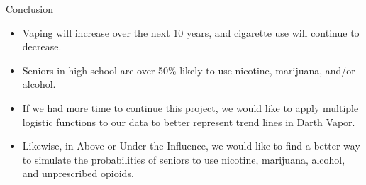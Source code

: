\documentclass{beamer}
\begin{document}
\begin{frame}{Conclusion}
        \begin{itemize}
        \item Vaping will increase over the next 10 years, and cigarette use will continue to decrease.
        \item Seniors in high school are over 50\% likely to use nicotine, marijuana, and/or alcohol.
        \item If we had more time to continue this project, we would like to apply multiple logistic functions to our data to better represent trend lines in Darth Vapor.
        \item Likewise, in Above or Under the Influence, we would like to find a better way to simulate the probabilities of seniors to use nicotine, marijuana, alcohol, and unprescribed opioids.
    \end{itemize}
\end{frame}
\end{document}
